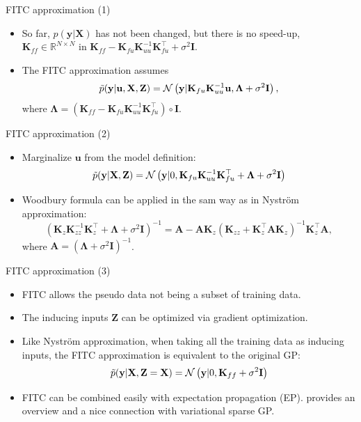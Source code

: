 \documentclass[14pt,aspectratio=1610]{beamer}
\newcommand{\yV}{\mathbf{y}}
\newcommand{\xM}{\mathbf{X}}
\newcommand{\K}{\mathbf{K}}
\newcommand{\R}{\mathbb{R}}
\newcommand{\uV}{\mathbf{u}}
\newcommand{\zM}{\mathbf{Z}}
\newcommand{\I}{\mathbf{I}}
\newcommand{\lambdaM}{\mathbf{\Lambda}}
\newcommand{\aM}{\mathbf{A}}
\begin{document}
\begin{frame}{FITC approximation (1)}
\begin{itemize}
\item So far, $p(\yV | \xM)$ has not been changed, but there is no speed-up, $\K_{ff} \in \R^{N\times N}$ in $\K_{ff} - \K_{fu} \K_{uu}^{-1} \K_{fu}^\top+\sigma^2\I$.

\item The FITC approximation assumes
\[
\tilde{p}(\yV| \uV, \xM, \zM)=\gaussianDist{\yV}{\K_{fu} \K_{uu}^{-1} \uV}{\lambdaM +\sigma^2\I},
\]
where $\lambdaM = (\K_{ff} - \K_{fu} \K_{uu}^{-1} \K_{fu}^\top)\circ \I$.
\end{itemize}
\end{frame}

\begin{frame}{FITC approximation (2)}
\begin{itemize}
\item Marginalize $\uV$ from the model definition:
\[
\tilde{p}(\yV| \xM, \zM) = \gaussianDist{\yV}{0}{\K_{fu} \K_{uu}^{-1} \K_{fu}^\top+\lambdaM +\sigma^2\I}
\]

\item Woodbury formula can be applied in the sam way as in Nystr\"{o}m approximation:
\[
(\K_z \K_{zz}^{-1} \K_z^\top+\lambdaM+\sigma^2\I)^{-1} = \aM - \aM \K_z (\K_{zz} + \K_z^\top\aM\K_z)^{-1}\K_z^\top\aM,
\]
where $\aM = (\lambdaM+\sigma^2\I)^{-1}$.
\end{itemize}
\end{frame}

\begin{frame}{FITC approximation (3)}
\begin{itemize}
\item FITC allows the pseudo data not being a subset of training data.

\item The inducing inputs $\zM$ can be optimized via gradient optimization.

\item Like Nystr\"{o}m approximation, when taking all the training data as inducing inputs, the FITC approximation is equivalent to the original GP:
\[
\tilde{p}(\yV| \xM, \zM=\xM) = \gaussianDist{\yV}{0}{\K_{ff} +\sigma^2\I}
\]
\item FITC can be combined easily with expectation propagation (EP). \cite{BuiEtAl2017} provides an overview and a nice connection with variational sparse GP.
\end{itemize}
\end{frame}
\end{document}
